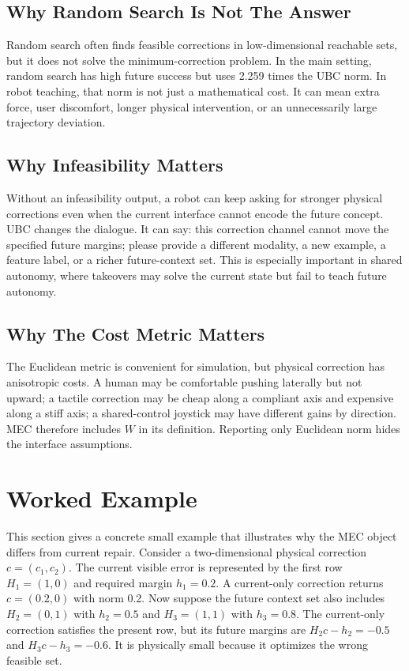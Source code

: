 \documentclass{article}
\begin{document}
\subsection{Why Random Search Is Not The Answer}

Random search often finds feasible corrections in low-dimensional reachable
sets, but it does not solve the minimum-correction problem. In the main setting,
random search has high future success but uses 2.259 times the UBC norm. In
robot teaching, that norm is not just a mathematical cost. It can mean extra
force, user discomfort, longer physical intervention, or an unnecessarily large
trajectory deviation.

\subsection{Why Infeasibility Matters}

Without an infeasibility output, a robot can keep asking for stronger physical
corrections even when the current interface cannot encode the future concept.
UBC changes the dialogue. It can say: this correction channel cannot move the
specified future margins; please provide a different modality, a new example, a
feature label, or a richer future-context set. This is especially important in
shared autonomy, where takeovers may solve the current state but fail to teach
future autonomy.

\subsection{Why The Cost Metric Matters}

The Euclidean metric is convenient for simulation, but physical correction has
anisotropic costs. A human may be comfortable pushing laterally but not upward;
a tactile correction may be cheap along a compliant axis and expensive along a
stiff axis; a shared-control joystick may have different gains by direction. MEC
therefore includes $W$ in its definition. Reporting only Euclidean norm hides
the interface assumptions.

\section{Worked Example}

This section gives a concrete small example that illustrates why the MEC object
differs from current repair. Consider a two-dimensional physical correction
$c=(c_1,c_2)$. The current visible error is represented by the first row
$H_1=(1,0)$ and required margin $h_1=0.2$. A current-only correction returns
$c=(0.2,0)$ with norm 0.2. Now suppose the future context set also includes
$H_2=(0,1)$ with $h_2=0.5$ and $H_3=(1,1)$ with $h_3=0.8$. The current-only
correction satisfies the present row, but its future margins are
$H_2c-h_2=-0.5$ and $H_3c-h_3=-0.6$. It is physically small because it optimizes
the wrong feasible set.
\end{document}
